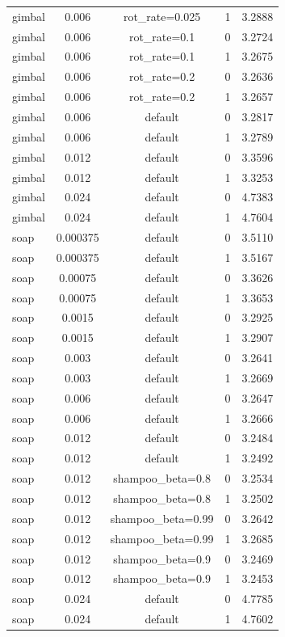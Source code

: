 \begin{tabular}{lcccc}
gimbal & 0.006 & rot\_rate=0.025 & 1 & 3.2888 \\
gimbal & 0.006 & rot\_rate=0.1 & 0 & 3.2724 \\
gimbal & 0.006 & rot\_rate=0.1 & 1 & 3.2675 \\
gimbal & 0.006 & rot\_rate=0.2 & 0 & 3.2636 \\
gimbal & 0.006 & rot\_rate=0.2 & 1 & 3.2657 \\
gimbal & 0.006 & default & 0 & 3.2817 \\
gimbal & 0.006 & default & 1 & 3.2789 \\
gimbal & 0.012 & default & 0 & 3.3596 \\
gimbal & 0.012 & default & 1 & 3.3253 \\
gimbal & 0.024 & default & 0 & 4.7383 \\
gimbal & 0.024 & default & 1 & 4.7604 \\
soap & 0.000375 & default & 0 & 3.5110 \\
soap & 0.000375 & default & 1 & 3.5167 \\
soap & 0.00075 & default & 0 & 3.3626 \\
soap & 0.00075 & default & 1 & 3.3653 \\
soap & 0.0015 & default & 0 & 3.2925 \\
soap & 0.0015 & default & 1 & 3.2907 \\
soap & 0.003 & default & 0 & 3.2641 \\
soap & 0.003 & default & 1 & 3.2669 \\
soap & 0.006 & default & 0 & 3.2647 \\
soap & 0.006 & default & 1 & 3.2666 \\
soap & 0.012 & default & 0 & 3.2484 \\
soap & 0.012 & default & 1 & 3.2492 \\
soap & 0.012 & shampoo\_beta=0.8 & 0 & 3.2534 \\
soap & 0.012 & shampoo\_beta=0.8 & 1 & 3.2502 \\
soap & 0.012 & shampoo\_beta=0.99 & 0 & 3.2642 \\
soap & 0.012 & shampoo\_beta=0.99 & 1 & 3.2685 \\
soap & 0.012 & shampoo\_beta=0.9 & 0 & 3.2469 \\
soap & 0.012 & shampoo\_beta=0.9 & 1 & 3.2453 \\
soap & 0.024 & default & 0 & 4.7785 \\
soap & 0.024 & default & 1 & 4.7602 \\
\bottomrule
\end{tabular}
